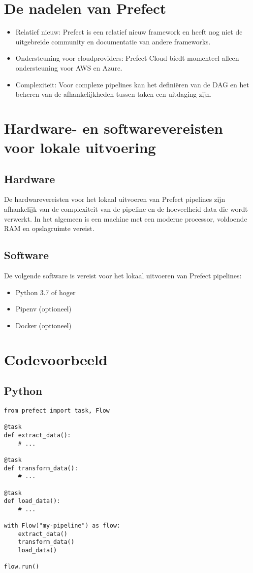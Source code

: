 \section{De nadelen van Prefect}
\begin{itemize}
    \item Relatief nieuw: Prefect is een relatief nieuw framework en heeft nog niet de uitgebreide community en documentatie van andere frameworks.
    \item Ondersteuning voor cloudproviders: Prefect Cloud biedt momenteel alleen ondersteuning voor AWS en Azure.
    \item Complexiteit: Voor complexe pipelines kan het definiëren van de DAG en het beheren van de afhankelijkheden tussen taken een uitdaging zijn.
\end{itemize}

\section{Hardware- en softwarevereisten voor lokale uitvoering}
\subsection{Hardware}
De hardwarevereisten voor het lokaal uitvoeren van Prefect pipelines zijn afhankelijk van de complexiteit van de pipeline en de hoeveelheid data die wordt verwerkt. In het algemeen is een machine met een moderne processor, voldoende RAM en opslagruimte vereist.
\subsection{Software}
De volgende software is vereist voor het lokaal uitvoeren van Prefect pipelines:
\begin{itemize}
    \item Python 3.7 of hoger
    \item Pipenv (optioneel)
    \item Docker (optioneel)
\end{itemize}

\section{Codevoorbeeld}
\subsection{Python}
\begin{verbatim}
from prefect import task, Flow

@task
def extract_data():
    # ...

@task
def transform_data():
    # ...

@task
def load_data():
    # ...

with Flow("my-pipeline") as flow:
    extract_data()
    transform_data()
    load_data()

flow.run()
\end{verbatim}

